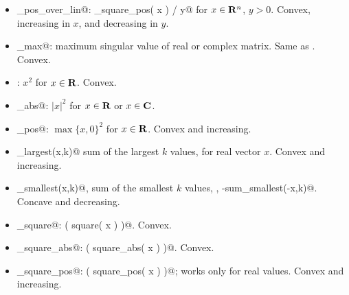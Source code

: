 \documentclass[12pt]{article}
\begin{document}
\begin{itemize}
\item \verb@quad_pos_over_lin@: \verb@sum_square_pos( x ) / y@
for $x\in\R^n$, $y>0$.
Convex, increasing in $x$, and decreasing in $y$.
\item \verb@sigma_max@: maximum singular value of real or 
complex matrix.  Same as \verb@norm@.  Convex.
\item \verb@square@: $x^2$ for $x \in \R$.
Convex.
\item \verb@square_abs@: $|x|^2$ for $x\in\R$ or $x\in\C$.
\item \verb@square_pos@: $\max\{x,0\}^2$ for $x\in\R$.
Convex and increasing.
\item \verb@sum_largest(x,k)@ sum of the largest $k$ values, for
real vector $x$.
Convex and increasing.
\item \verb@sum_smallest(x,k)@, sum of the smallest $k$ values,
\ie, \verb@-sum_smallest(-x,k)@.
Concave and decreasing.
\item \verb@sum_square@: \verb@sum( square( x ) )@. Convex.
\item \verb@sum_square_abs@: \verb@sum( square_abs( x ) )@. Convex.
\item \verb@sum_square_pos@: \verb@sum( square_pos( x ) )@; 
works only for real values. Convex and increasing.
\end{itemize}

\end{document}
